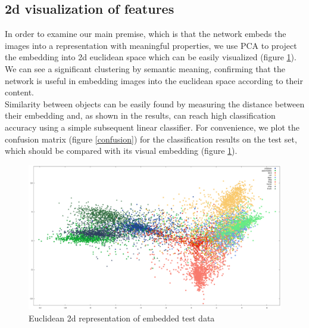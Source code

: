 \documentclass{article} %
\begin{document}
\subsection{2d visualization of features}
In order to examine our main premise, which is that the network embeds the images into a representation with meaningful properties, we
use PCA to project the embedding into 2d euclidean space which can be easily visualized (figure \ref{EuclideanRepresentation}).
We can see a significant clustering by semantic meaning, confirming that the network is useful in embedding
images into the euclidean space according to their content. \\ Similarity between objects can be easily found by  measuring the distance between their embedding and, as shown in the results, can reach high
classification accuracy using a simple subsequent linear classifier. For convenience, we plot the confusion matrix (figure \ref{confusion}) for the classification results on the test set, which should be compared with its visual embedding (figure \ref{EuclideanRepresentation}).

\begin{figure}[h]
\begin{center}
\includegraphics[width=1\linewidth]{EuclideanRepresentation.eps}
\end{center}
   \caption{Euclidean 2d representation of embedded test data}\label{EuclideanRepresentation}
\end{figure}
\end{document}
